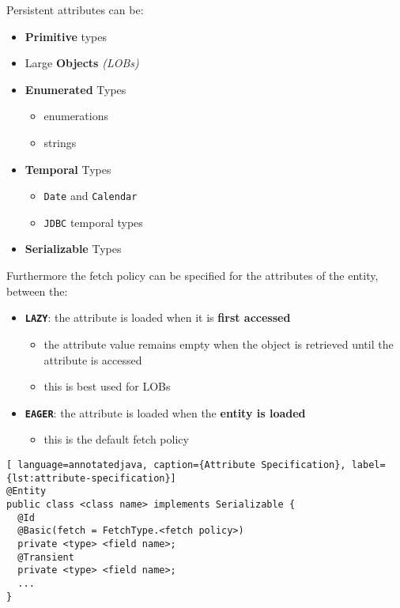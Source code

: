 \documentclass[english]{article}
\begin{document}
Persistent attributes can be:

\begin{itemize}
  \item \textbf{Primitive} types
  \item Large \textbf{Objects} \textit{(LOBs)}
  \item \textbf{Enumerated} Types
        \begin{itemize}
          \item \java enumerations
          \item strings
        \end{itemize}
  \item \textbf{Temporal} Types
        \begin{itemize}
          \item \java \texttt{Date} and \texttt{Calendar}
          \item \texttt{JDBC} temporal types
        \end{itemize}
  \item \textbf{Serializable} Types
\end{itemize}

Furthermore the fetch policy can be specified for the attributes of the entity, between the:

\begin{itemize}
  \item \textbf{\texttt{LAZY}}: the attribute is loaded when it is \textbf{first accessed}
        \begin{itemize}
          \item the attribute value remains empty when the object is retrieved until the attribute is accessed
          \item this is best used for LOBs
        \end{itemize}
  \item \textbf{\texttt{EAGER}}: the attribute is loaded when the \textbf{entity is loaded}
        \begin{itemize}
          \item this is the default fetch policy
        \end{itemize}
\end{itemize}

\begin{lstlisting}[ language=annotatedjava, caption={Attribute Specification}, label={lst:attribute-specification}]
@Entity
public class <class name> implements Serializable {
  @Id
  @Basic(fetch = FetchType.<fetch policy>)
  private <type> <field name>;
  @Transient
  private <type> <field name>;
  ...
}
\end{lstlisting}
\end{document}
